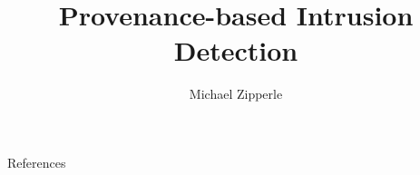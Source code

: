 \documentclass{beamer}
\title[Intrustion Detection]{Provenance-based Intrusion Detection}
\author{Michael Zipperle}
\begin{document}
\begin{frame}[plain]
  \titlepage
\end{frame}











    
    
    
    
    

    \begin{frame}{References}
        \printbibliography[heading=none]
    \end{frame}
\end{document}
